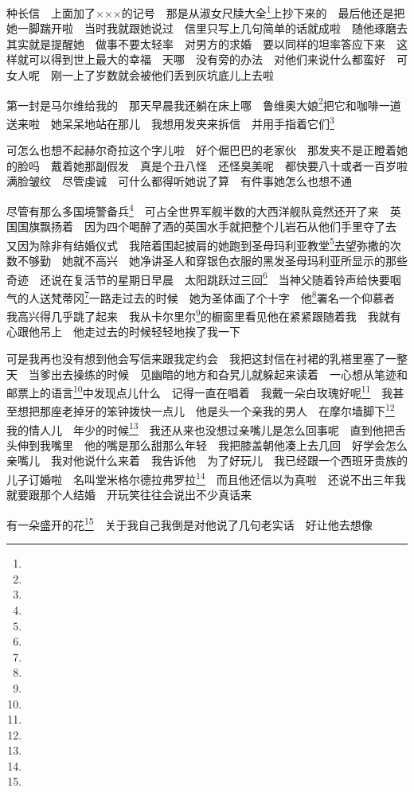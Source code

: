 种长信　上面加了×××的记号　那是从淑女尺牍大全\footnote{}上抄下来的　最后他还是把她一脚踹开啦　当时我就跟她说过　信里只写上几句简单的话就成啦　随他琢磨去　其实就是提醒她　做事不要太轻率　对男方的求婚　要以同样的坦率答应下来　这样就可以得到世上最大的幸福　天哪　没有旁的办法　对他们来说什么都蛮好　可女人呢　刚一上了岁数就会被他们丢到灰坑底儿上去啦　　
\par 第一封是马尔维给我的　那天早晨我还躺在床上哪　鲁维奥大娘\footnote{}把它和咖啡一道送来啦　她呆呆地站在那儿　我想用发夹来拆信　并用手指着它们\footnote{}　
\par 可怎么也想不起赫尔奇拉这个字儿啦　好个倔巴巴的老家伙　那发夹不是正瞪着她的脸吗　戴着她那副假发　真是个丑八怪　还怪臭美呢　都快要八十或者一百岁啦　满脸皱纹　尽管虔诚　可什么都得听她说了算　有件事她怎么也想不通　
\par 尽管有那么多国境警备兵\footnote{}　可占全世界军舰半数的大西洋舰队竟然还开了来　英国国旗飘扬着　因为四个喝醉了酒的英国水手就把整个儿岩石从他们手里夺了去　又因为除非有结婚仪式　我陪着围起披肩的她跑到圣母玛利亚教堂\footnote{}去望弥撒的次数不够勤　她就不高兴　她净讲圣人和穿银色衣服的黑发圣母玛利亚所显示的那些奇迹　还说在复活节的星期日早晨　太阳跳跃过三回\footnote{}　当神父随着铃声给快要咽气的人送梵蒂冈\footnote{}一路走过去的时候　她为圣体画了个十字　他\footnote{}署名一个仰慕者　我高兴得几乎跳了起来　我从卡尔里尔\footnote{}的橱窗里看见他在紧紧跟随着我　我就有心跟他吊上　他走过去的时候轻轻地挨了我一下　
\par 可是我再也没有想到他会写信来跟我定约会　我把这封信在衬裙的乳褡里塞了一整天　当爹出去操练的时候　见幽暗的地方和旮旯儿就躲起来读着　一心想从笔迹和邮票上的语言\footnote{}中发现点儿什么　记得一直在唱着　我戴一朵白玫瑰好呢\footnote{}　我甚至想把那座老掉牙的笨钟拨快一点儿　他是头一个亲我的男人　在摩尔墙脚下\footnote{}　我的情人儿　年少的时候\footnote{}　我还从来也没想过亲嘴儿是怎么回事呢　直到他把舌头伸到我嘴里　他的嘴是那么甜那么年轻　我把膝盖朝他凑上去几回　好学会怎么亲嘴儿　我对他说什么来着　我告诉他　为了好玩儿　我已经跟一个西班牙贵族的儿子订婚啦　名叫堂米格尔德拉弗罗拉\footnote{}　而且他还信以为真啦　还说不出三年我就要跟那个人结婚　开玩笑往往会说出不少真话来　
\par 有一朵盛开的花\footnote{}　关于我自己我倒是对他说了几句老实话　好让他去想像　
